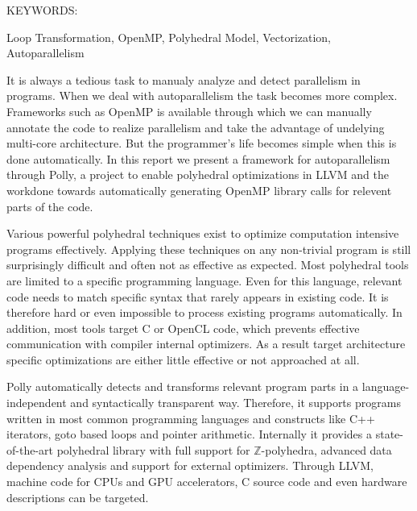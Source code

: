 \documentclass[MTech]{iitmdiss}
\begin{document}
\abstract

\noindent KEYWORDS: \hspace*{0.5em} \parbox[t]{4.4in}{Loop Transformation,
OpenMP, Polyhedral Model, Vectorization, Autoparallelism}

\vspace*{24pt}

It is always a tedious task to manualy analyze and detect parallelism in programs. When
we deal with autoparallelism the task becomes more complex. Frameworks such as OpenMP
is available through which we can manually annotate the code to realize parallelism and take the
advantage of undelying multi-core architecture. But the programmer's life becomes simple
when this is done automatically. In this report we present a framework for autoparallelism through Polly,
a project to enable polyhedral optimizations in LLVM and the workdone
towards automatically generating OpenMP library calls for relevent parts of the code.

Various powerful polyhedral techniques exist to optimize
computation intensive programs effectively.  Applying these techniques on any
non-trivial
program is still surprisingly difficult and often not as effective as expected.
Most polyhedral tools are limited to a specific programming language.  Even for
this language, relevant code needs to match specific syntax that rarely
appears in existing code.  It is therefore hard or even impossible to
process existing programs automatically.  In addition, most tools target C or
OpenCL code, which prevents effective communication with compiler internal
optimizers. As a result target architecture specific optimizations are
either little effective or not approached at all.

 Polly automatically detects and transforms relevant program parts in a
language-independent and syntactically transparent way. Therefore, it supports
programs written in most common programming languages and constructs
like C++ iterators, goto based loops and pointer arithmetic.  Internally it
provides a state-of-the-art polyhedral library with full support for
$\mathbb{Z}$-polyhedra, advanced data dependency analysis and
support for external optimizers. Through LLVM, machine code for CPUs and GPU accelerators,
C source code and even hardware descriptions can be targeted.


\pagebreak


\begin{singlespace}
\tableofcontents
\thispagestyle{empty}

\listoftables
{}
\listoffigures
{}
\end{singlespace}
\end{document}
